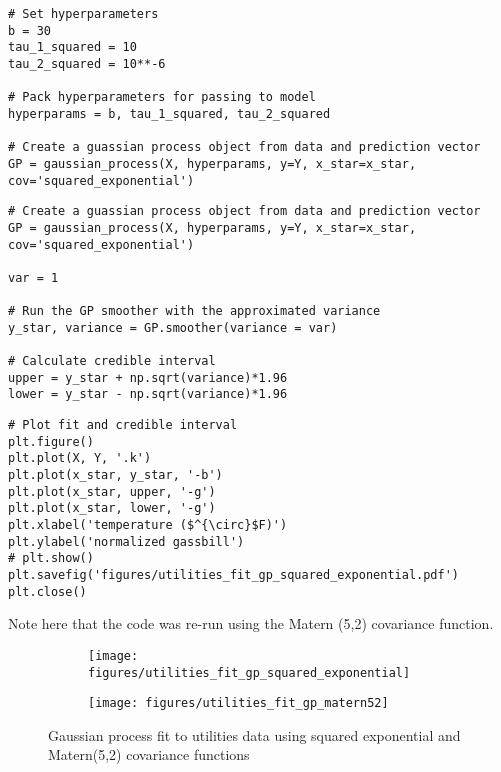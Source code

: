 \documentclass[10pt]{article}
\begin{document}
\begin{enumerate}[label=(\Alph*)]
        \begin{lstlisting}
# Set hyperparameters
b = 30
tau_1_squared = 10
tau_2_squared = 10**-6

# Pack hyperparameters for passing to model
hyperparams = b, tau_1_squared, tau_2_squared

# Create a guassian process object from data and prediction vector
GP = gaussian_process(X, hyperparams, y=Y, x_star=x_star, cov='squared_exponential')
        \end{lstlisting}

        \begin{lstlisting}
# Create a guassian process object from data and prediction vector
GP = gaussian_process(X, hyperparams, y=Y, x_star=x_star, cov='squared_exponential')

var = 1

# Run the GP smoother with the approximated variance
y_star, variance = GP.smoother(variance = var)

# Calculate credible interval
upper = y_star + np.sqrt(variance)*1.96
lower = y_star - np.sqrt(variance)*1.96
        \end{lstlisting}

        \begin{lstlisting}
# Plot fit and credible interval
plt.figure()
plt.plot(X, Y, '.k')
plt.plot(x_star, y_star, '-b')
plt.plot(x_star, upper, '-g')
plt.plot(x_star, lower, '-g')
plt.xlabel('temperature ($^{\circ}$F)')
plt.ylabel('normalized gassbill')
# plt.show()
plt.savefig('figures/utilities_fit_gp_squared_exponential.pdf')
plt.close()
        \end{lstlisting}

        Note here that the code was re-run using the Matern (5,2) covariance function.

            \begin{figure}
                \begin{subfigure}{.5\textwidth}
                  \centering
                  \texttt{[image: figures/utilities\_fit\_gp\_squared\_exponential]}
                \end{subfigure}%
                \begin{subfigure}{.5\textwidth}
                  \centering
                  \texttt{[image: figures/utilities\_fit\_gp\_matern52]}
                \end{subfigure}
            \caption{Gaussian process fit to utilities data using squared exponential and Matern(5,2) covariance functions}
            \label{fig:gp_fit_utilities}
            \end{figure}


\end{enumerate}
\end{document}
